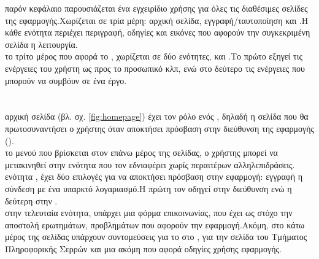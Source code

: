  παρόν κεφάλαιο παρουσιάζεται ένα εγχειρίδιο χρήσης για όλες τις διαθέσιμες σελίδες της εφαρμογής.Χωρίζεται σε τρία μέρη: αρχική σελίδα, εγγραφή/ταυτοποίηση και .Η κάθε ενότητα περιέχει περιγραφή, οδηγίες και εικόνες που αφορούν την συγκεκριμένη σελίδα η λειτουργία.\\
 το τρίτο μέρος που αφορά το , χωρίζεται σε δύο ενότητες,  και .Το πρώτο εξηγεί τις ενέργειες του χρήστη ως προς το προσωπικό  κλπ, ενώ στο δεύτερο τις ενέργειες που μπορούν να συμβόυν σε ένα έργο.\\
\section{}
 αρχική σελίδα (βλ. σχ. \ref{fig:homepage}) έχει τον ρόλο ενός , δηλαδή η σελίδα που θα πρωτοσυναντήσει ο χρήστης όταν αποκτήσει πρόσβαση στην διεύθυνση της εφαρμογής ().\\
 το μενού που βρίσκεται στον επάνω μέρος της σελίδας, ο χρήστης μπορεί να μετακινηθεί στην ενότητα που τον εδνιαφέρει χωρίς περαιτέρων αλληλεπιδράσεις.\\
 ενότητα , έχει δύο επιλογές για να αποκτήσει πρόσβαση στην εφαρμογή: εγγραφή η σύνδεση με ένα υπαρκτό λογαριασμό.Η πρώτη τον οδηγεί στην διεύθυνση  ενώ η δεύτερη στην .\\
 στην τελευταία ενότητα, υπάρχει μια φόρμα επικοινωνίας, που έχει ως στόχο την αποστολή ερωτημάτων, προβλημάτων που αφορούν την εφαρμογή.Ακόμη, στο κάτω μέρος της σελίδας υπάρχουν συντομεύσεις για το  στο , για την σελίδα του Τμήματος Πληροφορικής Σερρών και μια ακόμη που αφορά οδηγίες χρήσης εφαρμογής.\\
\pagebreak

